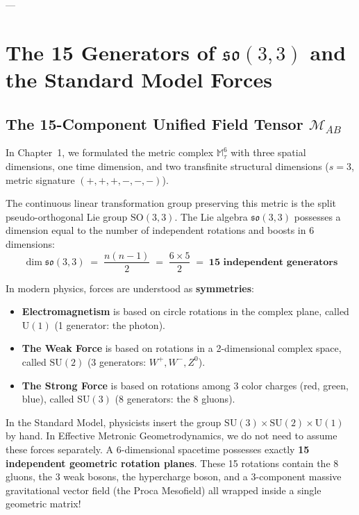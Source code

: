 \documentclass[
    12pt,
    a4paper,
    headings=normal,
    twoside=false,
    open=any,
    parskip=half
]{scrbook}
\begin{document}
---

\section{The 15 Generators of $\mathfrak{so}(3,3)$ and the Standard Model Forces}
\label{sec:ch8_so33_gauge_embedding}

\subsection{The 15-Component Unified Field Tensor $\mathcal{M}_{AB}$}

In Chapter~1, we formulated the metric complex $\mathbb{M}_\tau^6$ with three spatial dimensions, one time dimension, and two transfinite structural dimensions ($s = 3$, metric signature $(+,+,+,-,-,-)$). 

The continuous linear transformation group preserving this metric is the split pseudo-orthogonal Lie group $\mathrm{SO}(3,3)$. The Lie algebra $\mathfrak{so}(3,3)$ possesses a dimension equal to the number of independent rotations and boosts in 6 dimensions:
\begin{equation}
\dim \mathfrak{so}(3,3) \;=\; \frac{n(n - 1)}{2} \;=\; \frac{6 \times 5}{2} \;=\; \mathbf{15 \text{ independent generators}}
\label{eq:ch8_15_generators_count}
\end{equation}

\begin{intuitionbox}
In modern physics, forces are understood as \textbf{symmetries}:
\begin{itemize}[leftmargin=1.5em]
    \item \textbf{Electromagnetism} is based on circle rotations in the complex plane, called $\mathrm{U}(1)$ (1 generator: the photon).
    \item \textbf{The Weak Force} is based on rotations in a 2-dimensional complex space, called $\mathrm{SU}(2)$ (3 generators: $W^+, W^-, Z^0$).
    \item \textbf{The Strong Force} is based on rotations among 3 color charges (red, green, blue), called $\mathrm{SU}(3)$ (8 generators: the 8 gluons).
\end{itemize}
In the Standard Model, physicists insert the group $\mathrm{SU}(3) \times \mathrm{SU}(2) \times \mathrm{U}(1)$ by hand. In Effective Metronic Geometrodynamics, we do not need to assume these forces separately. A 6-dimensional spacetime possesses exactly \textbf{15 independent geometric rotation planes}. These 15 rotations contain the 8 gluons, the 3 weak bosons, the hypercharge boson, and a 3-component massive gravitational vector field (the Proca Mesofield) all wrapped inside a single geometric matrix!
\end{intuitionbox}
\end{document}
